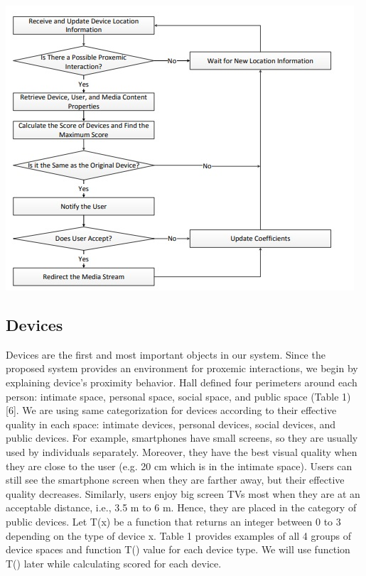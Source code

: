 \documentclass[runningheads,a4paper]{llncs}
\begin{document}
\includegraphics[]{fig1.jpg}

\subsection{Devices}

Devices are the first and most important objects in our system. Since the proposed system provides an environment for proxemic interactions, we begin by
explaining device’s proximity behavior. Hall defined four perimeters around each
person: intimate space, personal space, social space, and public space (Table 1)
[6]. We are using same categorization for devices according to their effective quality in each space: intimate devices, personal devices, social devices, and public
devices. For example, smartphones have small screens, so they are usually used
by individuals separately. Moreover, they have the best visual quality when they
are close to the user (e.g. 20 cm which is in the intimate space). Users can still
see the smartphone screen when they are farther away, but their effective quality decreases. Similarly, users enjoy big screen TVs most when they are at an
acceptable distance, i.e., 3.5 m to 6 m. Hence, they are placed in the category
of public devices. Let T(x) be a function that returns an integer between 0 to 3
depending on the type of device x. Table 1 provides examples of all 4 groups of
device spaces and function T() value for each device type. We will use function
T() later while calculating scored for each device.
\end{document}

